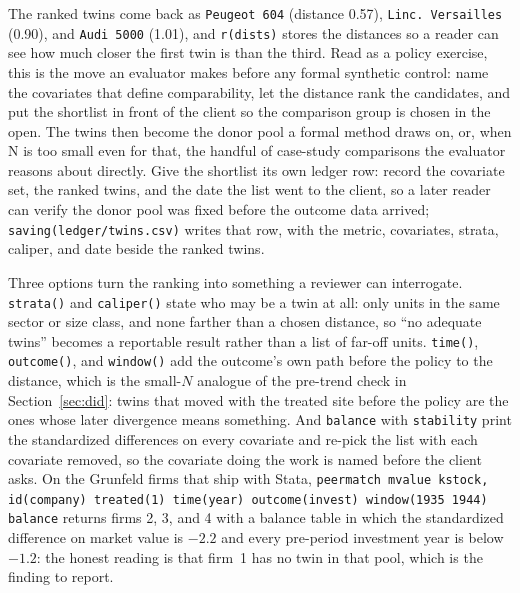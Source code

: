 The ranked twins come back as \texttt{Peugeot 604} (distance 0.57), \texttt{Linc.\ Versailles} (0.90), and \texttt{Audi 5000} (1.01), and \texttt{r(dists)} stores the distances so a reader can see how much closer the first twin is than the third. Read as a policy exercise, this is the move an evaluator makes before any formal synthetic control: name the covariates that define comparability, let the distance rank the candidates, and put the shortlist in front of the client so the comparison group is chosen in the open. The twins then become the donor pool a formal method draws on, or, when N is too small even for that, the handful of case-study comparisons the evaluator reasons about directly. Give the shortlist its own ledger row: record the covariate set, the ranked twins, and the date the list went to the client, so a later reader can verify the donor pool was fixed before the outcome data arrived; \texttt{saving(ledger/twins.csv)} writes that row, with the metric, covariates, strata, caliper, and date beside the ranked twins.

Three options turn the ranking into something a reviewer can interrogate. \texttt{strata()} and \texttt{caliper()} state who may be a twin at all: only units in the same sector or size class, and none farther than a chosen distance, so \enquote{no adequate twins} becomes a reportable result rather than a list of far-off units. \texttt{time()}, \texttt{outcome()}, and \texttt{window()} add the outcome's own path before the policy to the distance, which is the small-$N$ analogue of the pre-trend check in Section~\ref{sec:did}: twins that moved with the treated site before the policy are the ones whose later divergence means something. And \texttt{balance} with \texttt{stability} print the standardized differences on every covariate and re-pick the list with each covariate removed, so the covariate doing the work is named before the client asks. On the Grunfeld firms that ship with Stata, \texttt{peermatch mvalue kstock, id(company) treated(1) time(year) outcome(invest) window(1935 1944) balance} returns firms 2, 3, and 4 with a balance table in which the standardized difference on market value is $-2.2$ and every pre-period investment year is below $-1.2$: the honest reading is that firm~1 has no twin in that pool, which is the finding to report.

